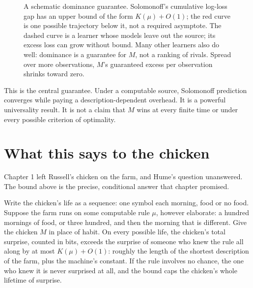\begin{figure}[h]
\centering
{}
\caption{A schematic dominance guarantee. Solomonoff's cumulative log-loss gap has an upper bound of the form $K(\mu)+O(1)$; the red curve is one possible trajectory below it, not a required asymptote. The dashed curve is a learner whose models leave out the source; its excess loss can grow without bound. Many other learners also do well: dominance is a guarantee for $M$, not a ranking of rivals. Spread over more observations, $M$'s guaranteed excess per observation shrinks toward zero.}
\label{fig:dominance}
\end{figure}

This is the central guarantee. Under a computable source, Solomonoff prediction converges while paying a description-dependent overhead. It is a powerful universality result. It is not a claim that $M$ wins at every finite time or under every possible criterion of optimality.

\section*{What this says to the chicken}

Chapter 1 left Russell's chicken on the farm, and Hume's question unanswered. The bound above is the precise, conditional answer that chapter promised.

Write the chicken's life as a sequence: one symbol each morning, food or no food. Suppose the farm runs on some computable rule $\mu$, however elaborate: a hundred mornings of food, or three hundred, and then the morning that is different. Give the chicken $M$ in place of habit. On every possible life, the chicken's total surprise, counted in bits, exceeds the surprise of someone who knew the rule all along by at most $K(\mu) + O(1)$: roughly the length of the shortest description of the farm, plus the machine's constant. If the rule involves no chance, the one who knew it is never surprised at all, and the bound caps the chicken's whole lifetime of surprise.

